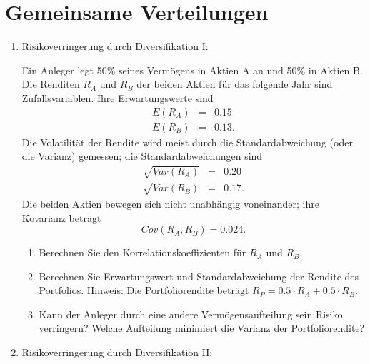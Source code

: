 \section[Gemeinsame Verteilungen]{Gemeinsame Verteilungen}

\begin{enumerate}
\item Risikoverringerung durch Diversifikation I:

Ein Anleger legt 50\% seines Verm\"{o}gens in Aktien A an und 50\% in Aktien
B. Die Renditen $R_{A}$ und $R_{B}$ der beiden Aktien f\"{u}r das folgende
Jahr sind Zufallsvariablen. Ihre Erwartungswerte sind 
\begin{eqnarray*}
E\left( R_{A}\right) &=&0.15 \\
E\left( R_{B}\right) &=&0.13.
\end{eqnarray*}%
Die Volatilit\"{a}t der Rendite wird meist durch die Standardabweichung
(oder die Varianz) gemessen; die Standardabweichungen sind 
\begin{eqnarray*}
\sqrt{Var\left( R_{A}\right) } &=&0.20 \\
\sqrt{Var\left( R_{B}\right) } &=&0.17.
\end{eqnarray*}%
Die beiden Aktien bewegen sich nicht unabh\"{a}ngig voneinander; ihre
Kovarianz betr\"{a}gt 
\begin{equation*}
Cov\left( R_{A},R_{B}\right) =0.024.
\end{equation*}
\begin{enumerate}
\item Berechnen Sie den Korrelationskoeffizienten f\"{u}r $R_{A}$ und $R_{B}$.
\item Berechnen Sie Erwartungswert und Standardabweichung der Rendite des
Portfolios. Hinweis: Die Portfoliorendite betr\"{a}gt $R_{P}=0.5\cdot
R_{A}+0.5\cdot R_{B}$.
\item Kann der Anleger durch eine andere Verm\"{o}gensaufteilung sein Risiko
verringern? Welche Aufteilung minimiert die Varianz der Portfoliorendite?
\end{enumerate}

\item Risikoverringerung durch Diversifikation II:


\end{enumerate}

